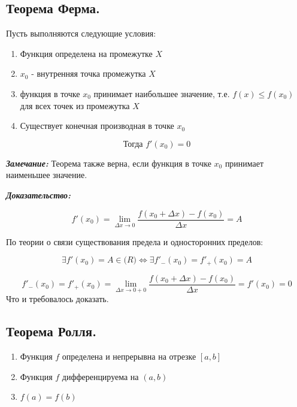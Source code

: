 \documentclass[a4paper,12pt]{article}
\theoremstyle{plain} %
\theoremstyle{definition} %
\theoremstyle{remark} %
\begin{document}
\newpage
\subsection*{Теорема Ферма.                                                                             }

Пусть выполняются следующие условия:

\begin{enumerate}
	\item Функция определена на промежутке $X$
	\item $x_0$ - внутренняя точка промежутка $X$
	\item функция в точке $x_0$ принимает наибольшее значение, т.е. $f(x) \leq f(x_0)$ для всех точек из промежутка $X$
	\item Существует конечная производная в точке $x_0$
\end{enumerate}
\[ \textbf{Тогда } f'(x_0) = 0 \]

\textit{\textbf{Замечание:}} Теорема также верна, если функция в точке $x_0$ принимает наименьшее значение.

\textit{\textbf{Доказательство:}}

\[
	f'(x_0) = \lim_{\Delta x \rightarrow 0} \frac{f(x_0 + \Delta x) - f(x_0)}{\Delta x} = A
\]

По теории о связи существования предела и односторонних пределов:

\[
	\exists f'(x_0) = A \in \mathbf(R) \Leftrightarrow \exists f'_-(x_0) = f'_+(x_0) = A
\]

\[
	f'_-(x_0) = f'_+(x_0) = \lim_{\Delta x \rightarrow 0 + 0} \frac{f(x_0 + \Delta x) - f(x_0)}{\Delta x} = f'(x_0) = 0
\]
Что и требовалось доказать.


\newpage
\subsection*{Теорема Ролля.                                                                             }

\begin{enumerate}
	\item Функция $f$ определена и непрерывна на отрезке $[a, b]$
	\item Функция $f$ дифференцируема на $(a, b)$
	\item $f(a) = f(b)$
\end{enumerate}
\end{document}
